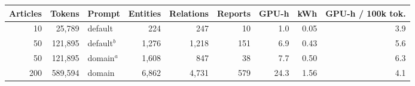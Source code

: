 \begin{tabular}{rrlrrrrrr}
\toprule
Articles & Tokens & Prompt & Entities & Relations & Reports & GPU-h & kWh & GPU-h / 100k tok. \\
\midrule
10 & 25,789 & default & 224 & 247 & 10 & 1.0 & 0.05 & 3.9 \\
50 & 121,895 & default$^b$ & 1,276 & 1,218 & 151 & 6.9 & 0.43 & 5.6 \\
50 & 121,895 & domain$^a$ & 1,608 & 847 & 38 & 7.7 & 0.50 & 6.3 \\
200 & 589,594 & domain & 6,862 & 4,731 & 579 & 24.3 & 1.56 & 4.1 \\
\bottomrule
\end{tabular}
